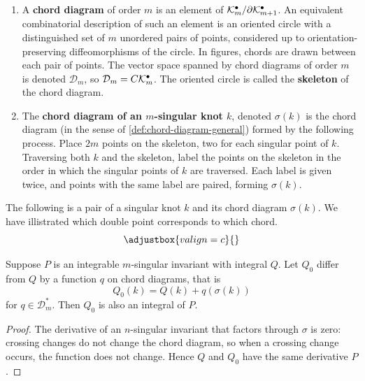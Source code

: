 \begin{definitions}
	\label{def:chord-diagram}
	\begin{enumerate}
		\item 
			\label{def:chord-diagram-general}
			A \textbf{chord diagram} of order \(m\) is an element of \(\mathcal{K}^{\bullet}_{m} / \partial \mathcal{K}^{\bullet}_{m + 1}\). An equivalent combinatorial description of such an element is an oriented circle with a distinguished set of \(m\) unordered pairs of points, considered up to orientation-preserving diffeomorphisms of the circle. In figures, chords are drawn between each pair of points. The vector space spanned by chord diagrams of order \(m\) is denoted \(\mathcal{D}_{m}\), so \(\mathcal{D}_{m} = C\mathcal{K}^{\bullet}_{m}\). The oriented circle is called the \textbf{skeleton} of the chord diagram.
		\item The \textbf{chord diagram of an \(m\)-singular knot \(k\)}, denoted \(\sigma(k)\) is the chord diagram (in the sense of \ref{def:chord-diagram-general}) formed by the following process. Place \(2m\) points on the skeleton, two for each singular point of \(k\). Traversing both \(k\) and the skeleton, label the points on the skeleton in the order in which the singular points of \(k\) are traversed. Each label is given twice, and points with the same label are paired, forming \(\sigma(k)\).
	\end{enumerate}
\end{definitions}

\begin{example}
	The following is a pair of a singular knot \(k\) and its chord diagram \(\sigma(k)\). We have illistrated which double point corresponds to which chord.
	\[
		\def\svgscale{0.3}
		\adjustbox{valign=c}{}
	\]
\end{example}

\begin{proposition}
	Suppose \(P\) is an integrable \(m\)-singular invariant with integral \(Q\). Let \(Q_{0}\) differ from \(Q\) by a function \(q\) on chord diagrams, that is
	\[Q_{0}(k) = Q(k) + q(\sigma(k))\]
	for \(q \in \mathcal{D}_{m}^{\ast}\). Then \(Q_{0}\) is also an integral of \(P\).
\end{proposition}

\begin{proof}
	The derivative of an \(n\)-singular invariant that factors through \(\sigma\) is zero: crossing changes do not change the chord diagram, so when a crossing change occurs, the function does not change. Hence \(Q\) and \(Q_{0}\) have the same derivative \(P\).
\end{proof}

